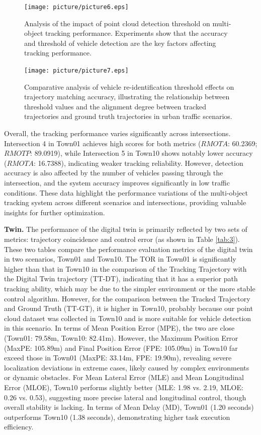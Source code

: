 \documentclass[journal,twoside,web]{ieeecolor}
\begin{document}
\begin{figure}[!t]
	\centering
	\centerline{\texttt{[image: picture/picture6.eps]}}
	\caption{Analysis of the impact of point cloud detection threshold on multi-object tracking performance. Experiments show that the accuracy and threshold of vehicle detection are the key factors affecting tracking performance.} 
	\label{fig6} 
\end{figure}

\begin{figure}[!t]
	\centering
		\centerline{\texttt{[image: picture/picture7.eps]}}
	\caption{Comparative analysis of vehicle re-identification threshold effects on trajectory matching accuracy, illustrating the relationship between threshold values and the alignment degree between tracked trajectories and ground truth trajectories in urban traffic scenarios.} 
	\label{fig7} 
\end{figure}

Overall, the tracking performance varies significantly across intersections. Intersection 4 in Town01 achieves high scores for both metrics (\(RMOTA\): 60.2369; \(RMOTP\): 89.0919), while Intersection 5 in Town10 shows notably lower accuracy (\(RMOTA\): 16.7388), indicating weaker tracking reliability.
However, detection accuracy is also affected by the number of vehicles passing through the intersection, and the system accuracy improves significantly in low traffic conditions.
These data highlight the performance variations of the multi-object tracking system across different scenarios and intersections, providing valuable insights for further optimization.

\textbf{Twin.}
The performance of the digital twin is primarily reflected by two sets of metrics: trajectory coincidence and control error (as shown in Table \ref{tab:3}). 
These two tables compare the performance evaluation metrics of the digital twin in two scenarios, Town01 and Town10. 
The TOR in Town01 is significantly higher than that in Town10 in the comparison of the Tracking Trajectory with the Digital Twin trajectory (TT-DT), indicating that it has a superior path tracking ability, which may be due to the simpler environment or the more stable control algorithm.
However, for the comparison between the Tracked Trajectory and Ground Truth (TT-GT), it is higher in Town10, probably because our point cloud dataset was collected in Town10 and is more suitable for vehicle detection in this scenario.
In terms of Mean Position Error (MPE), the two are close (Town01: 79.58m, Town10: 82.41m). 
However, the Maximum Position Error (MaxPE: 105.89m) and Final Position Error (FPE: 105.09m) in Town10 far exceed those in Town01 (MaxPE: 33.14m, FPE: 19.90m), revealing severe localization deviations in extreme cases, likely caused by complex environments or dynamic obstacles. 
For Mean Lateral Error (MLE) and Mean Longitudinal Error (MLOE), Town10 performs slightly better (MLE: 1.98 vs. 2.19, MLOE: 0.26 vs. 0.53), suggesting more precise lateral and longitudinal control, though overall stability is lacking. 
In terms of Mean Delay (MD), Town01 (1.20 seconds) outperforms Town10 (1.38 seconds), demonstrating higher task execution efficiency.
\end{document}
